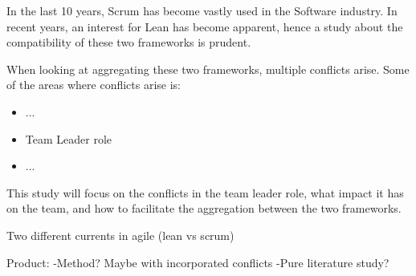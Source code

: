 In the last 10 years, Scrum has become vastly used in the Software industry.
In recent years, an interest for Lean has become apparent, hence a study about the compatibility of these two frameworks is prudent.

When looking at aggregating these two frameworks, multiple conflicts arise.
Some of the areas where conflicts arise is:
\begin{itemize}
	\item ...
	\item Team Leader role
	\item ...
\end{itemize} 

This study will focus on the conflicts in the team leader role, what impact it has on the team, and how to facilitate the aggregation between the two frameworks.






Two different currents in agile (lean vs scrum)

Product:
-Method? Maybe with incorporated conflicts 
-Pure literature study?


